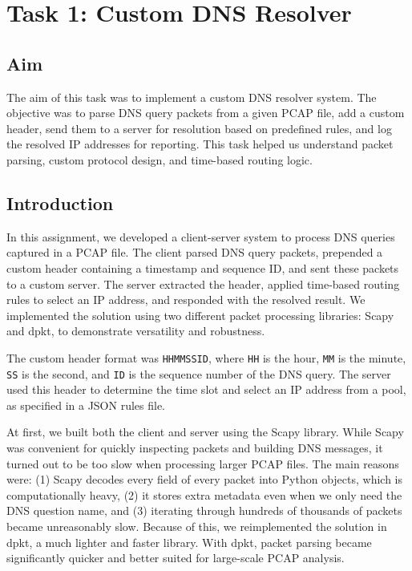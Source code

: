 \documentclass[10pt,a4paper]{report}
\begin{document}
\chapter{Task 1: Custom DNS Resolver}
\section{Aim}
The aim of this task was to implement a custom DNS resolver system. The objective was to parse DNS query packets from a given PCAP file, add a custom header, send them to a server for resolution based on predefined rules, and log the resolved IP addresses for reporting. This task helped us understand packet parsing, custom protocol design, and time-based routing logic.

\section{Introduction}
In this assignment, we developed a client-server system to process DNS queries captured in a PCAP file. The client parsed DNS query packets, prepended a custom header containing a timestamp and sequence ID, and sent these packets to a custom server. The server extracted the header, applied time-based routing rules to select an IP address, and responded with the resolved result. We implemented the solution using two different packet processing libraries: Scapy and dpkt, to demonstrate versatility and robustness.

The custom header format was \texttt{HHMMSSID}, where \texttt{HH} is the hour, \texttt{MM} is the minute, \texttt{SS} is the second, and \texttt{ID} is the sequence number of the DNS query. The server used this header to determine the time slot and select an IP address from a pool, as specified in a JSON rules file.

At first, we built both the client and server using the Scapy library. While Scapy was convenient for quickly inspecting packets and building DNS messages, it turned out to be too slow when processing larger PCAP files. The main reasons were: (1) Scapy decodes every field of every packet into Python objects, which is computationally heavy, (2) it stores extra metadata even when we only need the DNS question name, and (3) iterating through hundreds of thousands of packets became unreasonably slow. Because of this, we reimplemented the solution in dpkt, a much lighter and faster library. With dpkt, packet parsing became significantly quicker and better suited for large-scale PCAP analysis.
\end{document}
